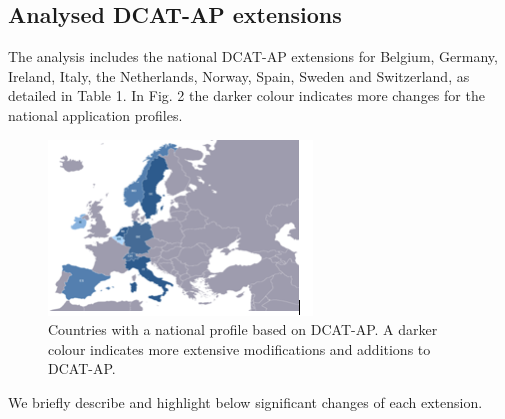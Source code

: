 \documentclass[<options>]{elsarticle}
\begin{document}
\subsection{Analysed DCAT-AP extensions}
The analysis includes the national DCAT-AP extensions for Belgium, Germany, Ireland, Italy, the Netherlands, Norway, Spain, Sweden and Switzerland, as detailed in Table 1. In Fig. 2 the darker colour indicates more changes for the national application profiles. 

\begin{figure}[!h]
\includegraphics{replace2.png}
\caption{Countries with a national profile based on DCAT-AP. A darker colour indicates more extensive modifications and additions to DCAT-AP.}
\end{figure}

We briefly describe and highlight below significant changes of each extension.
\end{document}
